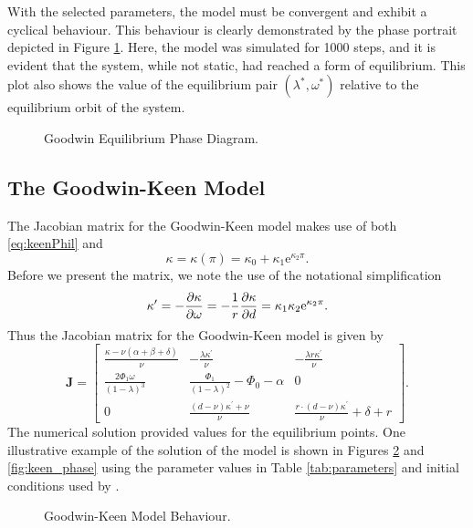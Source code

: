\documentclass[12pt, centerh1]{article}
\begin{document}
\noindent With the selected parameters, the model must be convergent and exhibit a cyclical behaviour. This behaviour is clearly demonstrated by the phase portrait depicted in Figure \ref{fig:goodwin_phase}. Here, the model was simulated for 1000 steps, and it is evident that the system, while not static, had reached a form of equilibrium. This plot also shows the value of the equilibrium pair $(\lambda^\ast, \omega^\ast)$ relative to the equilibrium orbit of the system.
\begin{figure}[H]
    \centering
    
    \caption{Goodwin Equilibrium Phase Diagram.}
    \label{fig:goodwin_phase}
\end{figure}

\subsection{The Goodwin-Keen Model}
The Jacobian matrix for the Goodwin-Keen model makes use of both \eqref{eq:keenPhil} and 
\begin{equation*} \label{eq:keenKappa}
    \kappa=\kappa(\pi) = \kappa_0 + \kappa_1\mathrm e^{\kappa_2\pi}.
\end{equation*}
Before we present the matrix, we note the use of the notational simplification
\begin{equation*}
    \kappa^\prime = -\pdv{\kappa}{\omega} = -\frac{1}{r}\pdv{\kappa}{d} = \kappa_1\kappa_2\mathrm e^{\kappa_2\pi}.
\end{equation*}
Thus the Jacobian matrix for the Goodwin-Keen model is given by
\begin{equation} \label{eq:jac_keen}
    \mathbf J = %
    \begin{bmatrix}
        \frac{\kappa-\nu(\alpha+\beta+\delta)}{\nu} & -\frac{\lambda\kappa^\prime}{\nu} & -\frac{\lambda r\kappa^\prime}{\nu} \\[0.5em]
        \frac{2\Phi_1\omega}{(1-\lambda)^3} & \frac{\Phi_1}{(1-\lambda)^2}-\Phi_0-\alpha & 0\\[0.5em]
        0 & \frac{(d-\nu)\kappa^\prime+\nu}{\nu} & \frac{r\cdot(d-\nu)\kappa^\prime}{\nu}+ \delta + r
    \end{bmatrix}.
\end{equation}
The numerical solution provided values for the equilibrium points. One illustrative example of the solution of the model is shown in Figures \ref{fig:keen} and \ref{fig:keen_phase} using the parameter values in Table \ref{tab:parameters} and initial conditions used by \citet{grasselli2012analysis}.
\begin{figure}[H]
    \centering
    
    \caption{Goodwin-Keen Model Behaviour.}
    \label{fig:keen}
\end{figure}
\end{document}
